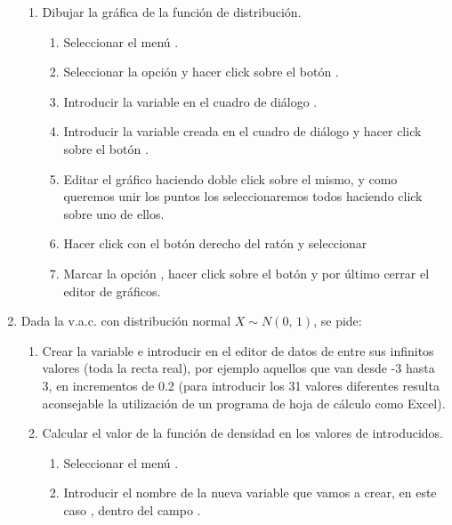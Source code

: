 \begin{enumerate}[leftmargin=*]
\begin{enumerate}
\item Dibujar la gráfica de la función de distribución.
\begin{indicacion}
\begin{enumerate}
\item Seleccionar el menú .
\item Seleccionar la opción  y hacer click sobre el 
botón .
\item Introducir la variable  en el cuadro de diálogo 
.
\item Introducir la variable creada  en el cuadro 
de diálogo  y hacer click sobre el botón .
\item Editar el gráfico haciendo doble click sobre el mismo, y como 
queremos unir los puntos los seleccionaremos todos
haciendo click sobre uno de ellos.
\item Hacer click con el botón derecho del ratón y seleccionar 
\item Marcar la opción , hacer click sobre el botón 
 y por último cerrar el editor de gráficos.
\end{enumerate}
\end{indicacion}
\end{enumerate}



\item Dada la v.a.c. con distribución normal $X\sim N(0,\,1)$, se pide:
\begin{enumerate}
\item Crear la variable  e introducir en el editor de datos 
de entre sus infinitos valores (toda la recta real), por ejemplo aquellos 
que van desde -3 hasta 3, en incrementos de 0.2 (para introducir los 31 
valores diferentes resulta aconsejable la utilización de un programa de 
hoja de cálculo como Excel).
\item  Calcular el valor de la función de densidad en los valores 
de  introducidos.
\begin{indicacion}
\begin{enumerate}
\item Seleccionar el menú .
\item Introducir el nombre de la nueva variable que vamos a crear, en 
este caso , dentro del campo .



\end{enumerate}
\end{indicacion}
\end{enumerate}
\end{enumerate}

